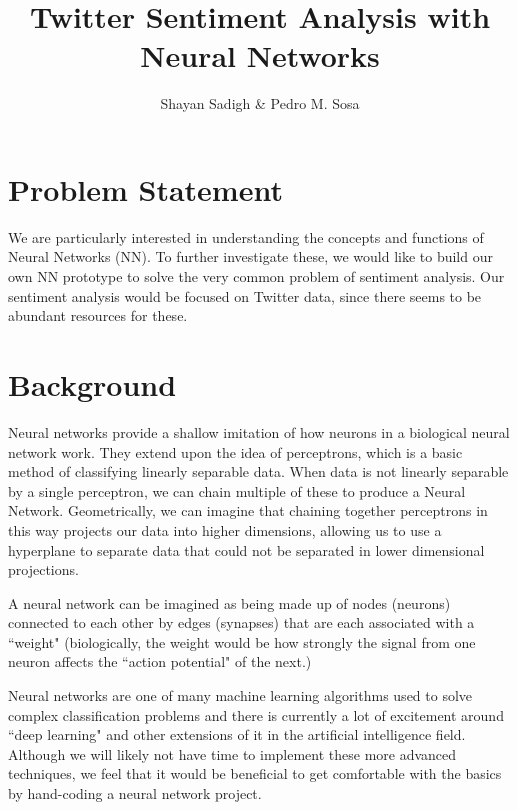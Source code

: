 \documentclass[]{article}
\title{Twitter Sentiment Analysis with Neural Networks}
\author{Shayan Sadigh \& Pedro M. Sosa}
\begin{document}
\maketitle

\section{Problem Statement}

\par We are particularly interested in understanding the concepts and functions of Neural Networks (NN). To further investigate these, we would like to build our own NN prototype to solve the very common problem of sentiment analysis. Our sentiment analysis would be focused on Twitter data, since there seems to be abundant resources for these.

\section{Background}

\par Neural networks provide a shallow imitation of how neurons in a biological neural network work. They extend upon the idea of perceptrons, which is a basic method of classifying linearly separable data. When data is not linearly separable by a single perceptron, we can chain multiple of these to produce a Neural Network. Geometrically, we can imagine that chaining together perceptrons in this way projects our data into higher dimensions, allowing us to use a hyperplane to separate data that could not be separated in lower dimensional projections.

\par A neural network can be imagined as being made up of nodes (neurons) connected to each other by edges (synapses) that are each associated with a ``weight" (biologically, the weight would be how strongly the signal from one neuron affects the ``action potential" of the next.)

\par Neural networks are one of many machine learning algorithms used to solve complex classification problems and there is currently a lot of excitement around ``deep learning" and other extensions of it in the artificial intelligence field. Although we will likely not have time to implement these more advanced techniques, we feel that it would be beneficial to get comfortable with the basics by hand-coding a neural network project.
\end{document}
